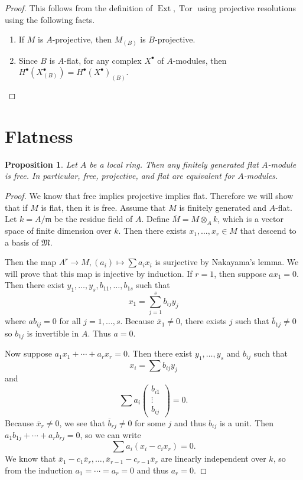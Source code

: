 \documentclass[leqno, openany]{memoir}
\newtheorem{prop}[thm]{Proposition}
\theoremstyle{definition}
\theoremstyle{remark}
\theoremstyle{plain}
\theoremstyle{definition}
\theoremstyle{remark}
\newcommand{\mf}[1]{\mathfrak{#1}}
\newcommand{\ol}[1]{\overline{#1}}
\DeclareMathOperator{\Ext}{Ext}
\DeclareMathOperator{\Tor}{Tor}
\begin{document}
\begin{proof}
    This follows from the definition of $\Ext, \Tor$ using projective resolutions using the following facts.
    \begin{enumerate}
        \item If $M$ is $A$-projective, then $M_{(B)}$ is $B$-projective.
        \item Since $B$ is $A$-flat, for any complex $X^{\bullet}$ of $A$-modules, then $H^{\bullet}(X_{(B)}^{\bullet}) = H^{\bullet}(X^{\bullet})_{(B)}$.
    \end{enumerate}
\end{proof}

\section{Flatness}%
\label{sec:flatness}

\begin{prop}
    Let $A$ be a local ring. Then any finitely generated flat $A$-module is free. In particular, free, projective, and flat are equivalent for $A$-modules.
\end{prop}

\begin{proof}
    We know that free implies projective implies flat. Therefore we will show that if $M$ is flat, then it is free. Assume that $M$ is finitely generated and $A$-flat. Let $k = A / \mf{m}$ be the residue field of $A$. Define $\ol{M} = M \otimes_A k$, which is a vector space of finite dimension over $k$. Then there exists $x_1, \ldots, x_r \in M$ that descend to a basis of $\mf{M}$.

    Then the map $A^r \to M, (a_i) \mapsto \sum a_i x_i$ is surjective by Nakayama's lemma. We will prove that this map is injective by induction. If $r = 1$, then suppose $a x_1 = 0$. Then there exist $y_1, \ldots, y_s, b_{11}, \ldots, b_{1s}$ such that
    \[ x_1 = \sum_{j=1}^s b_{ij} y_j \]
    where $ab_{ij} = 0$ for all $j = 1, \ldots, s$. Because $\ol{x}_1 \neq 0$, there exists $j$ such that $\ol{b}_{1j} \neq 0$ so $b_{1j}$ is invertible in $A$. Thus $a = 0$.

    Now suppose $a_1 x_1 + \cdots + a_r x_r = 0$. Then there exist $y_1, \ldots, y_s$ and $b_{ij}$ such that
    \[ x_i = \sum b_{ij} y_j \]
    and \[ \sum a_i \begin{pmatrix}
        b_{i1} \\ \vdots \\ b_{ij}
    \end{pmatrix} = 0. \]
    Because $\ol{x}_r \neq 0$, we see that $\ol{b}_{rj} \neq 0$ for some $j$ and thus $b_{ij}$ is a unit. Then $a_1 b_{1j} + \cdots + a_r b_{rj} = 0$, so we can write
    \[ \sum a_i (x_i - c_i x_r) = 0. \]
    We know that $\ol{x}_1 - c_1 \ol{x}_r, \ldots, \ol{x}_{r-1} - c_{r-1} \ol{x}_r$ are linearly independent over $k$, so from the induction $a_1 = \cdots = a_r = 0$ and thus $a_r = 0$.
\end{proof}
\end{document}
